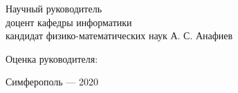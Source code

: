 \vspace*{4\baselineskip}

\begin{adjustwidth}{2em}{0pt}
\noindent
Научный руководитель\\
доцент кафедры информатики\\
кандидат физико-математических наук
\null\hfill А. С. Анафиев
\end{adjustwidth}

\vspace*{1\baselineskip}

\begin{adjustwidth}{2em}{0pt}
\noindent
Оценка руководителя:  \underline{\hspace{7em}} \null\hfill \underline{\hspace{7em}}
\end{adjustwidth}

\vfill

\begin{center} Симферополь --- 2020 \end{center}
\thispagestyle{empty} %
\restoregeometry